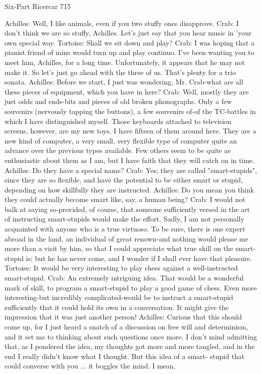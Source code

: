 Six-Part Ricercar                                                                        715

Achilles: Well, I like animals, even if you two stuffy ones disapprove.
Crab: I don't think we are so stuffy, Achilles. Let's just say that you hear music in 'your
   own special way.
Tortoise: Shall we sit down and play?
Crab: I was hoping that a pianist friend of mine would turn up and play continuo. I've
   been wanting you to meet him, Achilles, for a long time. Unfortunately, it appears
   that he may not make it. So let's just go ahead with the three of us. That's plenty for a
   trio sonata.
Achilles: Before we start, I just was wondering, Mr. Crab-what are all these pieces of
   equipment, which you have in here?
Crab: Well, mostly they are just odds and ends-bits and pieces of old broken
   phonographs. Only a few souvenirs (nervously tapping the buttons), a few souvenirs
   of-of the TC-battles in which I have distinguished myself. Those keyboards attached
   to television screens, however, are my new toys. I have fifteen of them around here.
   They are a new kind of computer, a very small, very flexible type of computer quite
   an advance over the previous types available. Few others seem to be quite as
   enthusiastic about them as I am, but I have faith that they will catch on in time.
Achilles: Do they have a special name?
Crab: Yes; they are called "smart-stupids", since they are so flexible, and have the
   potential to be either smart or stupid, depending on how skillfully they are instructed.
Achilles: Do you mean you think they could actually become smart like, say, a human
   being?
Crab: I would not balk at saying so-provided, of course, that someone sufficiently versed
   in the art of instructing smart-stupids would make the effort. Sadly, I am not
   personally acquainted with anyone who is a true virtuoso. To be sure, there is one
   expert abroad in the land, an individual of great renown-and nothing would please me
   more than a visit by him, so that I could appreciate what true skill on the smart-stupid
   is; but he has never come, and I wonder if I shall ever have that pleasure.
Tortoise: It would be very interesting to play chess against a well-instructed smart-stupid.
Crab: An extremely intriguing idea. That would be a wonderful mark of skill, to program
   a smart-stupid to play a good game of chess. Even more interesting-but incredibly
   complicated-would be to instruct a smart-stupid sufficiently that it could hold its own
   in a conversation. It might give the impression that it was just another person!
Achilles: Curious that this should come up, for I just heard a snatch of a discussion on
   free will and determinism, and it set me to thinking about such questions once more. I
   don't mind admitting that, as I pondered the idea, my thoughts got more and more
   tangled, and in the end I really didn't know what I thought. But this idea of a smart-
   stupid that could converse with you ... it boggles the mind. I mean,




